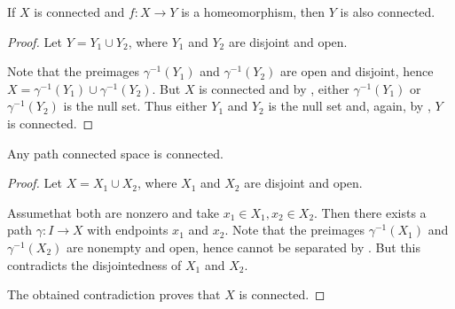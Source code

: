 \begin{proposition}\label{thm:homomorphism_preserves_connectedness}
  If \( X \) is connected and \( f: X \to Y \) is a homeomorphism, then \( Y \) is also connected.
\end{proposition}
\begin{proof}
  Let \( Y = Y_1 \cup Y_2 \), where \( Y_1 \) and \( Y_2 \) are disjoint and open.

  Note that the preimages \( \gamma^{-1}(Y_1) \) and \( \gamma^{-1}(Y_2) \) are open and disjoint, hence \( X = \gamma^{-1}(Y_1) \cup \gamma^{-1}(Y_2) \). But \( X \) is connected and by , either \( \gamma^{-1}(Y_1) \) or \( \gamma^{-1}(Y_2) \) is the null set. Thus either \( Y_1 \) and \( Y_2 \) is the null set and, again, by , \( Y \) is connected.
\end{proof}

\begin{proposition}\label{thm:path_connected_implies_connected}
  Any path connected space is connected.
\end{proposition}
\begin{proof}
  Let \( X = X_1 \cup X_2 \), where \( X_1 \) and \( X_2 \) are disjoint and open.

  Assume\LEM that both are nonzero and take \( x_1 \in X_1, x_2 \in X_2 \). Then there exists a path \( \gamma: I \to X \) with endpoints \( x_1 \) and \( x_2 \). Note that the preimages \( \gamma^{-1}(X_1) \) and \( \gamma^{-1}(X_2) \) are nonempty and open, hence cannot be separated by . But this contradicts the disjointedness of \( X_1 \) and \( X_2 \).

  The obtained contradiction proves that \( X \) is connected.
\end{proof}
